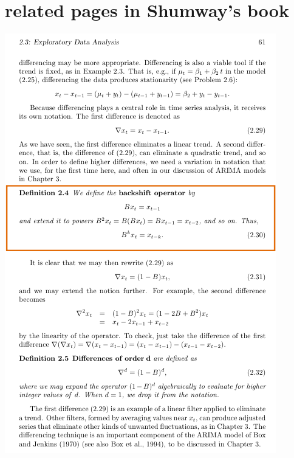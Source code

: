 \documentclass{article}
\begin{document}
\section*{related pages in Shumway's book}
\centering\includegraphics[width=.9\textwidth]{shumway1}
\end{document}
